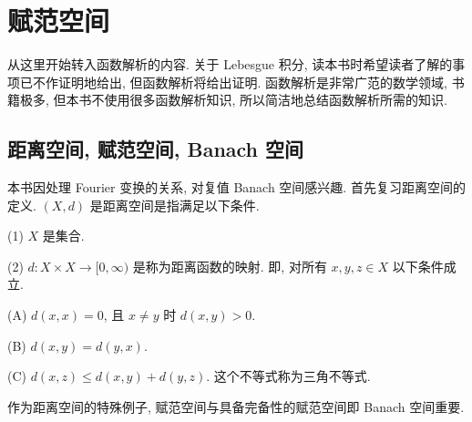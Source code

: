 
\section{赋范空间}\label{sec:2.4}































从这里开始转入函数解析的内容. 关于 Lebesgue 积分, 读本书时希望读者了解的事项已不作证明地给出, 但函数解析将给出证明. 函数解析是非常广范的数学领域, 书籍极多, 但本书不使用很多函数解析知识, 所以简洁地总结函数解析所需的知识.

\subsection*{距离空间, 赋范空间, Banach 空间}

本书因处理 Fourier 变换的关系, 对复值 Banach 空间感兴趣. 首先复习距离空间的定义. $(X, d)$ 是距离空间是指满足以下条件.

(1) $X$ 是集合.

(2) $d: X \times X \to [0, \infty)$ 是称为距离函数的映射. 即, 对所有 $x, y, z \in X$ 以下条件成立.

(A) $d(x, x) = 0$, 且 $x \neq y$ 时 $d(x, y) > 0$.

(B) $d(x, y) = d(y, x)$.

(C) $d(x, z) \leq d(x, y) + d(y, z)$. 这个不等式称为三角不等式.

作为距离空间的特殊例子, 赋范空间与具备完备性的赋范空间即 Banach 空间重要.

